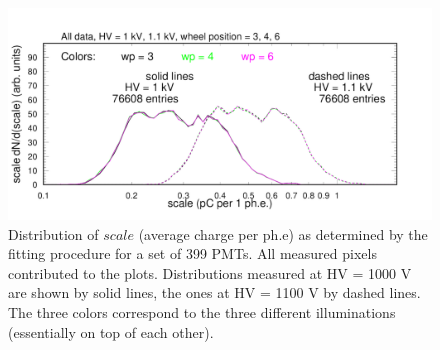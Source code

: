 \begin{figure}[hbt]
	\centering
	\includegraphics[width=0.98\linewidth,trim=0 15 50 35,clip]{figures/pglobal_sc.pdf}
	\caption{Distribution of $scale$ (average charge per ph.e) as determined by the fitting procedure for a set of 399 PMTs. All measured pixels contributed to the plots. Distributions measured at HV = 1000 V are shown by solid lines, the ones at HV = 1100 V by dashed lines. The three colors correspond to the three different illuminations (essentially on top of each other).
	}
	\label{fig:pglobal_sc}
\end{figure}

